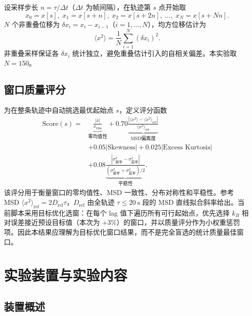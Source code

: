 \documentclass[12pt,a4paper]{ctexart}
\begin{document}
设采样步长 $n = \tau/\Delta t$（$\Delta t$ 为帧间隔），在轨迹第 $s$ 点开始取
\begin{equation}
  x_0 = x[s],\; x_1 = x[s+n],\; x_2 = x[s+2n],\; \ldots,\; x_N = x[s+Nn].
  \label{eq:sampling}
\end{equation}
$N$ 个非重叠位移为 $\delta x_i = x_i - x_{i-1}$（$i=1,\ldots,N$），均方位移估计为
\begin{equation}
  \langle x^2\rangle = \frac{1}{N}\sum_{i=1}^N (\delta x_i)^2.
  \label{eq:msd_est}
\end{equation}
非重叠采样保证各 $\delta x_i$ 统计独立，避免重叠估计引入的自相关偏差。本实验取 $N=150$。

\subsection{窗口质量评分}

为在整条轨迹中自动挑选最优起始点 $s$，定义评分函数
\begin{equation}
\begin{aligned}
  \text{Score}(s) ={}& \underbrace{\frac{|\bar{x}|}{x_\text{rms}}}_{\text{零均值性}}
  + 0.70\underbrace{\frac{|\langle x^2\rangle - \langle x^2\rangle_\text{ref}|}{\langle x^2\rangle_\text{ref}}}_{\text{MSD偏离度}} \\
  &+ 0.05|\text{Skewness}| + 0.025|\text{Excess Kurtosis}| \\
  &+ 0.08\underbrace{\frac{|\sigma^2_\text{前半} - \sigma^2_\text{后半}|}{(\sigma^2_\text{前半}+\sigma^2_\text{后半})/2}}_{\text{平稳性}}.
\end{aligned}
\label{eq:score}
\end{equation}
该评分用于衡量窗口的零均值性、MSD 一致性、分布对称性和平稳性。参考 MSD $\langle x^2\rangle_\text{ref} = 2D_\text{ref}\tau$，$D_\text{ref}$ 由全轨迹 $\tau\leq\SI{20}{\second}$ 段的 MSD 直线拟合斜率给出。当前脚本采用目标优化选窗：在每个 lag 值下遍历所有可行起始点，优先选择 $k_B$ 相对误差接近预设目标值（本次为 $+3\%$）的窗口，并以质量评分作为小权重惩罚项。因此本结果应理解为目标优化窗口结果，而不是完全盲选的统计质量最佳窗口。

\section{实验装置与实验内容}

\subsection{装置概述}
\end{document}

